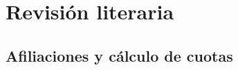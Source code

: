 \documentclass[10pt]{beamer}
\begin{document}
\begin{comment}
El principal objetivo es facilitar la adaptación del sistema frente a cambios en su contexto. En particular, se focaliza en el cálculo de cuotas de los afiliados. Se eligió esta parte de las reglas de negocio en concreto por su complejidad y propensidad a cambios.
Una forma de lograr esto es mediante la separación de las reglas de negocio del código fuente. Para esto, se suele hacer uso de un motor de reglas, que permite la ejecución de reglas externas al código de la aplicación. Este motor suele formar parte de un sistema de gestión de reglas de negocio, que además del motor incluye herramientas para la gestión de las reglas.

De este objetivo se extraen los objetivos específicos

- Extraer las reglas de negocio actualmente en uso, partiendo de la documentación correspondiente y la materialización de las reglas de negocio presente en el código fuente. Las reglamentaciones utilizadas son las que se encontraban en vigor durante la última actualización del código fuente (documento de 2023).
- Expresar dichas reglas en un lenguaje que resulte entendible para el personal de la obra social.
- Permitir la gestión de las especificaciones obtenidas de forma independiente al sistema.
- Reducir el esfuerzo requerido para materializar cambios en las reglas del negocio
    - modificar el código fuente del sistema, ni
    - realizar el despliegue de una nueva versión.

Se espera que el logro de estos objetivos reduzca o elimine la incidencia de los problemas antes mencionados

Por otro lado, partiendo de la revisión de la implementación actual de las reglas de negocio en el código fuente, se agrega un objetivo adicional:
- Reformular el código fuente para que sea más legible.

Esto para mejorar la compresión de la implementación actual y brindar un mejor punto de partida para la posterior comparación con el motor de reglas.
\end{comment}

\section{Revisión literaria}

\subsection{Afiliaciones y cálculo de cuotas}
\end{document}
